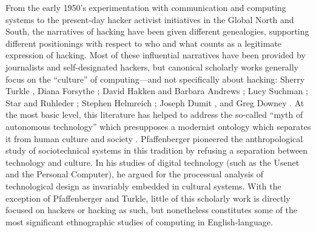 \documentclass[10pt,letter,oneside]{scrartcl}
\begin{document}
From the early 1950's experimentation with communication and computing systems
to the present-day hacker activist initiatives in the Global North and South,
the narratives of hacking have been given different genealogies, supporting
different positionings with respect to who and what counts as a legitimate
expression of hacking.  Most of these influential narratives have been provided
by journalists and self-designated hackers, but canonical scholarly works
generally focus on the ``culture'' of computing---and not specifically about
hacking: Sherry Turkle \cite*{turkle_life_1995,turkle_second_1984}, Diana
Forsythe \cite*{forsythe_studying_2001}; David Hakken and Barbara Andrews
\cite*{hakken_computing_1993}; Lucy Suchman \cite*{suchman_plans_1987}; Star and
Ruhleder \cite*{star_infrastructure_1996}; Stephen Helmreich
\cite*{helmreich_silicon_1998}; Joseph Dumit \cite*{dumit_picturing_2004}, and
Greg Downey \cite*{downey_machine_1998}. At the most basic level, this
literature has helped to address the so-called ``myth of autonomous technology''
which presupposes a modernist ontology which separates it from human culture and
society \parencite{latour_wehave_2008,winner_auto_1978,}.  Pfaffenberger
\cite*{pfaffenberger_social_1992} pioneered the anthropological study of
sociotechnical systems in this tradition by refusing a separation between
technology and culture. In his studies of digital technology (such as the Usenet
and the Personal Computer), he argued for the processual analysis of
technological design as invariably embedded in cultural systems. With the
exception of Pfaffenberger and Turkle, little of this scholarly work is directly
focused on hackers or hacking as such, but nonetheless constitutes some of the
most significant ethnographic studies of computing in English-language.
\end{document}
